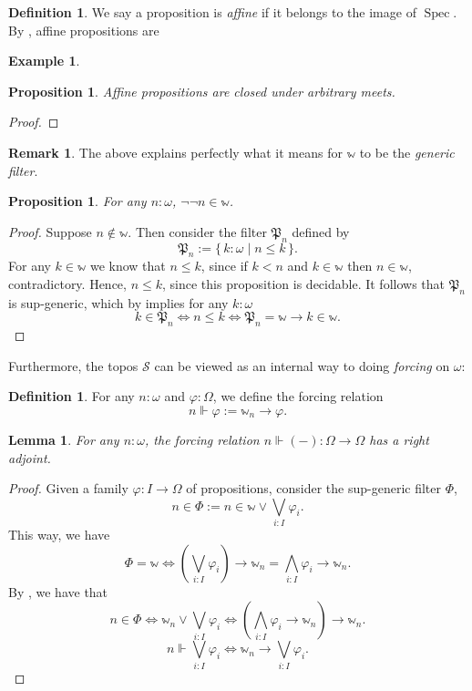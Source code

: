 \documentclass[a4paper,10pt]{amsart}
\newtheorem{lemma}[theorem]{Lemma}
\newtheorem{proposition}[theorem]{Proposition}
\theoremstyle{definition}
\newtheorem{example}[theorem]{Example}
\newtheorem{definition}[theorem]{Definition}
\newtheorem{remark}[theorem]{Remark}
\newcommand{\mc}[1]{\mathcal{#1}}
\newcommand{\mbb}[1]{\mathbb{#1}}
\newcommand{\mf}[1]{\mathfrak{#1}}
\newcommand{\eff}{\Leftrightarrow}
\newcommand{\scomp}[2]{\{\,#1\mid#2\,\}}
\newcommand{\prth}[1]{\left(#1\right)}
\newcommand{\spec}{\operatorname{Spec}}
\newcommand{\um}{\mbb w}
\begin{document}
\begin{definition}
  We say a proposition is \emph{affine} if it belongs to the image of $\spec$. By , affine propositions are 
\end{definition}

\begin{example}
  
\end{example}

\begin{proposition}
  Affine propositions are closed under arbitrary meets.
\end{proposition}
\begin{proof}
  
\end{proof}



\begin{remark}
  The above explains perfectly what it means for $\um$ to be the \emph{generic filter}.
\end{remark}

\begin{proposition}
  For any $n : \omega$, $\neg\neg n \in \um$.
\end{proposition}
\begin{proof}
  Suppose $n \not\in \um$. Then consider the filter $\mf P_n$ defined by
  \[ \mf P_n := \scomp{k : \omega}{n \le k}. \]
  For any $k \in \um$ we know that $n \le k$, since if $k < n$ and $k \in \um$ then $n \in \um$, contradictory. Hence, $n \le k$, since this proposition is decidable. It follows that $\mf P_n$ is sup-generic, which by  implies for any $k : \omega$
  \[ k \in \mf P_n \eff n \le k \eff \mf P_n = \um \to k \in \um. \]
\end{proof}


Furthermore, the topos $\mc S$ can be viewed as an internal way to doing \emph{forcing} on $\omega$: 

\begin{definition}
  For any $n : \omega$ and $\varphi : \Omega$, we define the forcing relation
  \[ n \Vdash \varphi := \um_n \to \varphi. \]
\end{definition}

\begin{lemma}
  For any $n : \omega$, the forcing relation $n \Vdash (-) : \Omega \to \Omega$ has a right adjoint.
\end{lemma}
\begin{proof}
  Given a family $\varphi : I \to \Omega$ of propositions, consider the sup-generic filter $\Phi$,
  \[ n \in \Phi := n \in \um \vee \bigvee_{i:I}\varphi_i. \]
  This way, we have
  \[ \Phi = \um \eff \prth{\bigvee_{i:I}\varphi_i} \to \um_n = \bigwedge_{i:I} \varphi_i \to \um_n. \]
  By , we have that
  \[ n \in \Phi \eff \um_n \vee \bigvee_{i:I}\varphi_i \eff \prth{\bigwedge_{i:I}\varphi_i \to \um_n} \to \um_n. \]
  \[ n \Vdash \bigvee_{i:I}\varphi_i \eff \um_n \to \bigvee_{i:I}\varphi_i. \]
\end{proof}
\end{document}
